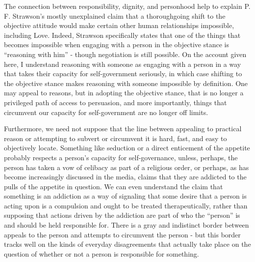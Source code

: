 \documentclass[phd,12pt,oneside,paper=letterpaper]{ubcthesis}
\begin{document}
The connection between responsibility, dignity, and personhood help to explain P. F. Strawson's mostly unexplained claim that a thoroughgoing shift to the objective attitude would make certain other human relationships impossible, including Love. Indeed, Strawson specifically states that one of the things that becomes impossible when engaging with a person in the objective stance is ``reasoning with him'' - though negotiation is still possible. On the account given here, I understand reasoning with someone as engaging with a person in a way that takes their capacity for self-government seriously, in which case shifting to the objective stance makes reasoning with someone impossible by definition. One may appeal to reasons, but in adopting the objective stance, that is no longer a privileged path of access to persuasion, and more importantly, things that circumvent our capacity for self-government are no longer off limits. 

Furthermore, we need not suppose that the line between appealing to practical reason or attempting to subvert or circumvent it is hard, fast, and easy to objectively locate. Something like seduction or a direct enticement of the appetite probably respects a person's capacity for self-governance, unless, perhaps, the person has taken a vow of celibacy as part of a religious order, or perhaps, as has become increasingly discussed in the media, claims that they are addicted to the pulls of the appetite in question. We can even understand the claim that something is an addiction as a way of signaling that some desire that a person is acting upon is a compulsion and ought to be treated therapeutically, rather than supposing that actions driven by the addiction are part of who the ``person'' is and should be held responsible for.  There is a gray and indistinct border between appeals to the person and attempts to circumvent the person - but this border tracks well on the kinds of everyday disagreements that actually take place on the question of whether or not a person is responsible for something. 
\end{document}

